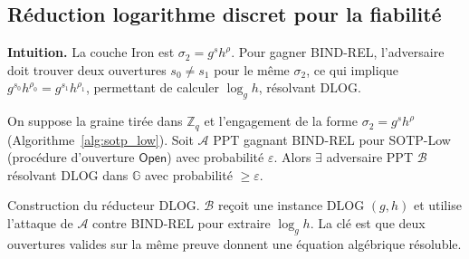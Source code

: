 \begin{sloppypar}
\subsection{R\'eduction logarithme discret pour la fiabilit\'e}

\noindent\textbf{Intuition.} La couche Iron est
$\sigma_2 = g^s h^\rho$. Pour gagner BIND-REL, l'adversaire doit trouver
deux ouvertures $s_0 \neq s_1$ pour le m\^eme $\sigma_2$, ce qui implique
$g^{s_0}h^{\rho_0} = g^{s_1}h^{\rho_1}$, permettant de calculer
$\log_g h$, r\'esolvant DLOG.

\begin{theorem}\label{thm:ann_sotp_low_rel}
On suppose la graine tir\'ee dans $\mathbb{Z}_q$ et l'engagement de la forme
$\sigma_2 = g^{s}h^{\rho}$ (Algorithme~\ref{alg:sotp_low}). Soit $\mathcal{A}$ PPT
gagnant BIND-REL pour SOTP-Low (proc\'edure d'ouverture $\mathsf{Open}$) avec
probabilit\'e $\varepsilon$. Alors $\exists$ adversaire PPT $\mathcal{B}$ r\'esolvant
DLOG dans $\mathbb{G}$ avec probabilit\'e $\geq \varepsilon$.
\end{theorem}

\begin{Preuve}

\begin{cmtEtape}{Construction du r\'educteur DLOG.}
$\mathcal{B}$ re\c{c}oit une instance DLOG $(g, h)$ et utilise l'attaque
de $\mathcal{A}$ contre BIND-REL pour extraire $\log_g h$. La cl\'e est
que deux ouvertures valides sur la m\^eme preuve donnent une \'equation
alg\'ebrique r\'esoluble.
\end{cmtEtape}


\end{Preuve}
\end{sloppypar}
